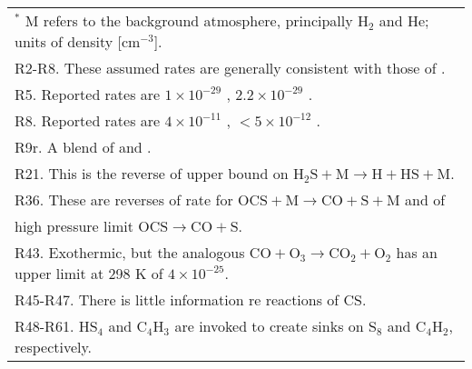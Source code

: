\documentclass[preprint]{aastex}
\newcounter{reaction}
\begin{document}
\begin{longtable}{l lcl l p{3.5cm} }
\hline
\hline
\multicolumn{6}{l}{ $^{\ast}$ M refers to the background atmosphere, principally H$_2$ and He; units of density [cm$^{-3}$].}\\
\multicolumn{6}{l}{R2-R8. These assumed rates are generally consistent with those of \citet{Moses2002,Yung2009}.}\\
\multicolumn{6}{l}{R5. Reported rates are $1\times 10^{-29}$ \citep{Langford1973}, $2.2\times 10^{-29}$ \citep{Nicholas1979}.}\\
\multicolumn{6}{l}{R8. Reported rates are $4\times 10^{-11}$ \citep{Schofield1973}, $<5\times 10^{-12}$ \citep{Nicholas1979}.}\\
\multicolumn{6}{l}{R9r. A blend of \citet{Woiki1995a} and \citet{Shiina1998}.}\\
\multicolumn{6}{l}{R21. This is the reverse of \citet{Shiina1998} upper bound on $\mathrm{H}_2\mathrm{S} + \mathrm{M} \rightarrow \mathrm{H}+\mathrm{HS} + \mathrm{M} $.}\\
\multicolumn{6}{l}{R36. These are reverses of \citet{Oya1994} rate for $\mathrm{OCS} + \mathrm{M} \rightarrow \mathrm{CO}+\mathrm{S} + \mathrm{M} $ and of }\\
\multicolumn{6}{l}{\phantom{R36. }\citet{Schofield1973} high pressure limit $\mathrm{OCS} \rightarrow \mathrm{CO}+\mathrm{S} $.}\\
\multicolumn{6}{l}{R43. Exothermic, but the analogous $\mathrm{CO} + \mathrm{O}_3 \rightarrow \mathrm{CO}_2+\mathrm{O}_2$ has an upper limit at 298 K of $4\times 10^{-25}$.}\\
\multicolumn{6}{l}{R45-R47. There is little information re reactions of CS.}\\
\multicolumn{6}{l}{R48-R61. HS$_4$ and C$_4$H$_3$ are invoked to create sinks on S$_8$ and C$_4$H$_2$, respectively.}\\
\end{longtable}  



 
\end{document}
